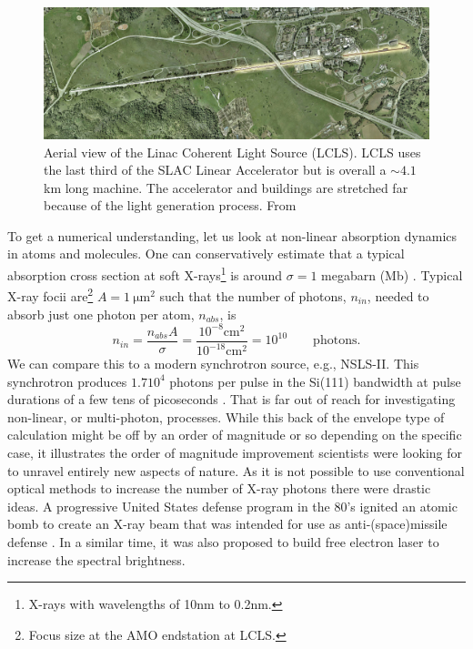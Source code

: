 \begin{figure}[t]
	\centering
		\includegraphics[width=1.00\textwidth]{images/aerial-view-lcls.jpg}
	\caption[Aerial view of the Linac Coherent Light Source.]{Aerial view of the Linac Coherent Light Source (LCLS). LCLS uses the last third of the SLAC Linear Accelerator but is overall a $\sim 4.1$ km long machine. The accelerator and buildings are stretched far because of the light generation process. From \cite{SLAC-2009-Flickr}}
	\label{fig:aerial-view-lcls}
\end{figure}
To get a numerical understanding, let us look at non-linear absorption dynamics in atoms and molecules. One can conservatively estimate that a typical absorption cross section at soft X-rays\footnote{X-rays with wavelengths of 10nm to 0.2nm.} is around $\sigma = 1$ megabarn (Mb) \cite{Bucksbaum-2011-Book}. Typical X-ray focii are\footnote{Focus size at the AMO endstation at LCLS.} $A = 1\ \mathrm{\mu m}^{2}$ such that the number of photons, $n_{in}$, needed to absorb just one photon per atom, $n_{abs}$, is
\begin{equation}
n_{in} = \frac{n_{abs} A}{\sigma} = \frac{10^{-8} \mathrm{cm}^{2}}{10^{-18} \mathrm{cm}^{2}}=10^{10}\qquad \mathrm{photons.}
\label{eq:absorption-cross-section}
\end{equation}
We can compare this to a modern synchrotron source, e.g., NSLS-II. This synchrotron produces $1.7 10^{4}$ photons per pulse in the Si(111) bandwidth at pulse durations of a few tens of picoseconds \cite{Williams-2016-PC}. That is far out of reach for investigating non-linear, or multi-photon, processes. While this back of the envelope type of calculation might be off by an order of magnitude or so depending on the specific case, it illustrates the order of magnitude improvement scientists were looking for to unravel entirely new aspects of nature. As it is not possible to use conventional optical methods to increase the number of X-ray photons there were drastic ideas. A progressive United States defense program in the 80's ignited an atomic bomb to create an X-ray beam that was intended for use as anti-(space)missile defense \cite{Hecht-2008-OPN}. In a similar time, it was also proposed to build free electron laser \cite{Kondratenko-1980-PA,Bonifacio-1984-OC} to increase the spectral brightness.\\[1\baselineskip]
